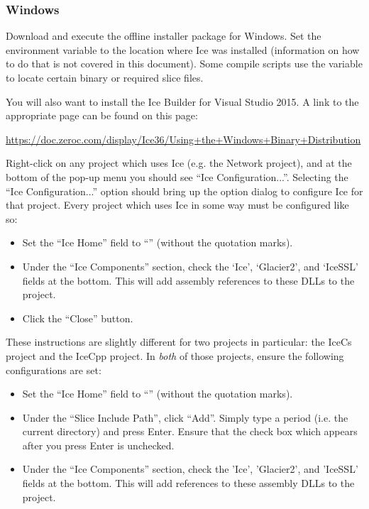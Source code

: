 \subsubsection*{Windows}

Download and execute the offline installer package for Windows. Set the environment variable
 to the location where Ice was installed (information on how to do that is
not covered in this document). Some compile scripts use the  variable to
locate certain binary or required slice files.

You will also want to install the Ice Builder for Visual Studio 2015. A link to the appropriate
page can be found on this page:

\vspace{1.0ex}
\centerline{\url{https://doc.zeroc.com/display/Ice36/Using+the+Windows+Binary+Distribution}}

Right-click on any project which uses Ice (e.g. the Network project), and at the bottom of the
pop-up menu you should see ``Ice Configuration...''. Selecting the ``Ice Configuration...''
option should bring up the option dialog to configure Ice for that project. Every project which
uses Ice in some way must be configured like so:

\begin{itemize}
\item Set the ``Ice Home'' field to ``'' (without the quotation marks).
\item Under the ``Ice Components'' section, check the `Ice', `Glacier2', and `IceSSL' fields at
  the bottom. This will add assembly references to these DLLs to the project.
\item Click the ``Close'' button.
\end{itemize}

These instructions are slightly different for two projects in particular: the IceCs project and
the IceCpp project. In \emph{both} of those projects, ensure the following configurations are
set:

\begin{itemize}
\item Set the ``Ice Home'' field to ``'' (without the quotation marks).
\item Under the ``Slice Include Path'', click ``Add''. Simply type a period (i.e. the current
  directory) and press Enter. Ensure that the check box which appears after you press Enter is
  unchecked.
\item Under the ``Ice Components'' section, check the 'Ice', 'Glacier2', and 'IceSSL' fields at
  the bottom. This will add references to these assembly DLLs to the project.
\end{itemize}

